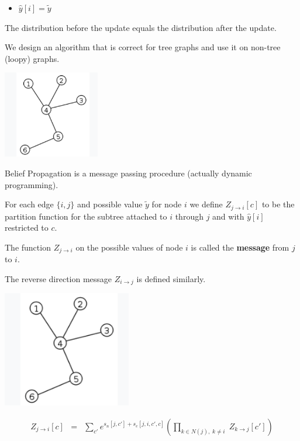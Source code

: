 {\begin{itemize}
\item $\hat{y}[i] = \tilde{y}$
\end{itemize}


\vfill
The distribution before the update equals the distribution after the update.


We design an algorithm that is correct for tree graphs and use it on non-tree (loopy) graphs.


\centerline{\includegraphics[height=1.5in]{../images/Tree}}

\vfill
Belief Propagation is a message passing procedure (actually dynamic programming).

\vfill
For each edge $\{i,j\}$ and possible value $\tilde{y}$ for node $i$ we define {\color{red} $Z_{j \rightarrow i}[c]$}
to be  the partition function for the subtree attached to $i$ through $j$ and
with $\hat{y}[i]$ restricted to $c$.

\vfill
The function $Z_{j \rightarrow i}$ on the possible values of node $i$ is called the {\bf message} from $j$ to $i$.

\vfill
The reverse direction message $Z_{i \rightarrow j}$ is defined similarly.


\centerline{\includegraphics[height=2.0in]{../images/Tree}}

\vfill
\begin{eqnarray*}
  Z_{j\rightarrow i}[c] & = & \sum_{c'}  e^{s_n[j,c'] + s_e[j,i,c',c]}
    \left(\prod_{k \in N(j),\;k \not = i}\;Z_{k\rightarrow j}[c']\right)
\end{eqnarray*}

}
